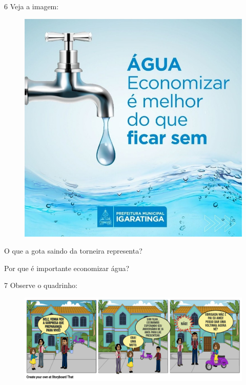 \pagebreak
\num{6} Veja a imagem:

\begin{figure}[htpb!]
\centering
\includegraphics[width=\textwidth]{media/image133.jpeg}
\end{figure}


\begin{escolha}
\item O que a gota saindo da torneira representa?


\item Por que é importante economizar água?

\end{escolha}

\pagebreak
\num{7} Observe o quadrinho:

\begin{figure}[htpb!]
\centering
\includegraphics[width=\textwidth]{media/image129.png}
\end{figure}

